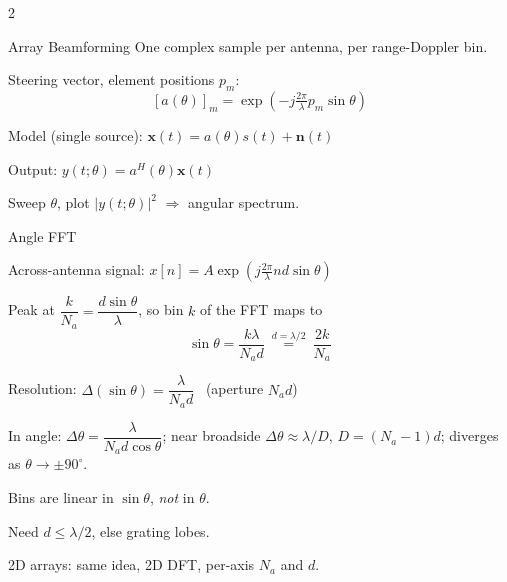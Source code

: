 \begin{multicols}{2}
\begin{sectionbox}{Array Beamforming}
One complex sample per antenna, per range-Doppler bin.
\begin{cheatlist}
\item Steering vector, element positions $p_m$:
  \[ [a(\theta)]_m = \exp\!\left(-j\tfrac{2\pi}{\lambda}p_m\sin\theta\right) \]
\item Model (single source): $\bm{x}(t) = a(\theta)s(t) + \bm{n}(t)$
\item Output: $y(t;\theta) = a^H(\theta)\bm{x}(t)$
\item Sweep $\theta$, plot $|y(t;\theta)|^2$ $\Rightarrow$ angular spectrum.
\end{cheatlist}
\end{sectionbox}

\begin{sectionbox}{Angle FFT}
\begin{cheatlist}
\item Across-antenna signal: $x[n] = A\exp\!\left(j\tfrac{2\pi}{\lambda}nd\sin\theta\right)$
\item Peak at $\dfrac{k}{N_a} = \dfrac{d\sin\theta}{\lambda}$, so bin $k$ of the FFT maps to
  \[ \sin\theta = \frac{k\lambda}{N_ad} \ \overset{d=\lambda/2}{=} \ \frac{2k}{N_a} \]
\item Resolution: $\Delta(\sin\theta) = \dfrac{\lambda}{N_ad}$ \ (aperture $N_ad$)
\item In angle: $\Delta\theta = \dfrac{\lambda}{N_ad\cos\theta}$; near broadside $\Delta\theta \approx \lambda/D$, $D = (N_a-1)d$; diverges as $\theta \to \pm90^\circ$.
\item Bins are linear in $\sin\theta$, \emph{not} in $\theta$.
\item Need $d \le \lambda/2$, else grating lobes.
\item 2D arrays: same idea, 2D DFT, per-axis $N_a$ and $d$.
\end{cheatlist}
\end{sectionbox}


\end{multicols}
